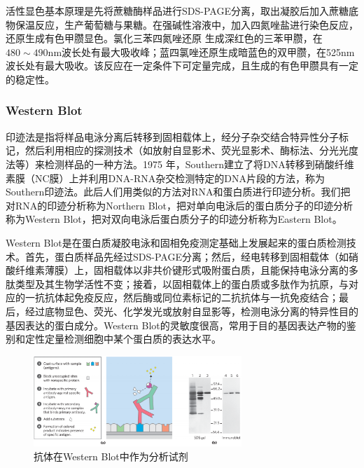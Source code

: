 活性显色基本原理是先将蔗糖酶样品进行SDS-PAGE分离，取出凝胶后加入蔗糖底物保温反应，生产葡萄糖与果糖。在强碱性溶液中，加入四氮唑盐进行染色反应，还原生成有色甲臜显色。氯化三苯四氮唑还原
生成深红色的三苯甲臜，在$480\sim490\mathrm{nm}$波长处有最大吸收峰；蓝四氯唑还原生成暗蓝色的双甲臜，在525nm波长处有最大吸收。该反应在一定条件下可定量完成，且生成的有色甲臜具有一定的稳定性。

\subsubsection{Western Blot}
印迹法是指将样品电泳分离后转移到固相载体上，经分子杂交结合特异性分子标记，然后利用相应的探测技术（如放射自显影术、荧光显影术、酶标法、分光光度法等）来检测样品的一种方法。1975 年，Southern建立了将DNA转移到硝酸纤维素膜（NC膜）上并利用DNA-RNA杂交检测特定的DNA片段的方法，称为Southern印迹法。此后人们用类似的方法对RNA和蛋白质进行印迹分析。我们把对RNA的印迹分析称为Northern Blot，把对单向电泳后的蛋白质分子的印迹分析称为Western Blot，把对双向电泳后蛋白质分子的印迹分析称为Eastern Blot。

Western Blot是在蛋白质凝胶电泳和固相免疫测定基础上发展起来的蛋白质检测技术。首先，蛋白质样品先经过SDS-PAGE分离；然后，经电转移到固相载体（如硝酸纤维素薄膜）上，固相载体以非共价键形式吸附蛋白质，且能保持电泳分离的多肽类型及其生物学活性不变；接着，以固相载体上的蛋白质或多肽作为抗原，与对应的一抗抗体起免疫反应，然后酶或同位素标记的二抗抗体与一抗免疫结合；最后，经过底物显色、荧光、化学发光或放射自显影等，检测电泳分离的特异性目的基因表达的蛋白成分。Western Blot的灵敏度很高，常用于目的基因表达产物的鉴别和定性定量检测细胞中某个蛋白质的表达水平。

\begin{figure}[H]
    \centering
    \includegraphics[width = 0.7\textwidth]{figure/Some Pictures/Antibodies as analytical reagents.png}
    \caption{抗体在Western Blot中作为分析试剂~\cite{nelson2021lehninger}}
    \label{fig:enter-label}
\end{figure}

